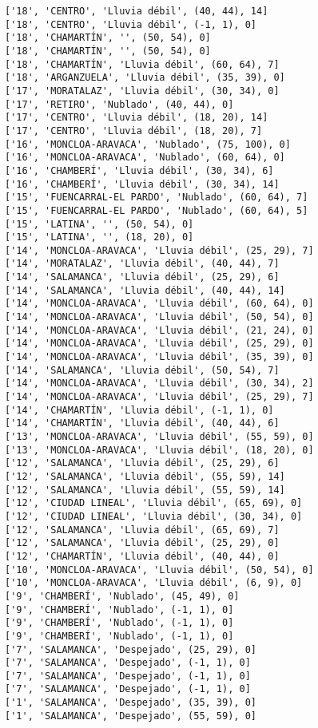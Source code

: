 \documentclass[11pt]{article}
\begin{document}
\begin{Verbatim}[commandchars=\\\{\}]
['18', 'CENTRO', 'Lluvia débil', (40, 44), 14]
['18', 'CENTRO', 'Lluvia débil', (-1, 1), 0]
['18', 'CHAMARTÍN', '', (50, 54), 0]
['18', 'CHAMARTÍN', '', (50, 54), 0]
['18', 'CHAMARTÍN', 'Lluvia débil', (60, 64), 7]
['18', 'ARGANZUELA', 'Lluvia débil', (35, 39), 0]
['17', 'MORATALAZ', 'Lluvia débil', (30, 34), 0]
['17', 'RETIRO', 'Nublado', (40, 44), 0]
['17', 'CENTRO', 'Lluvia débil', (18, 20), 14]
['17', 'CENTRO', 'Lluvia débil', (18, 20), 7]
['16', 'MONCLOA-ARAVACA', 'Nublado', (75, 100), 0]
['16', 'MONCLOA-ARAVACA', 'Nublado', (60, 64), 0]
['16', 'CHAMBERÍ', 'Lluvia débil', (30, 34), 6]
['16', 'CHAMBERÍ', 'Lluvia débil', (30, 34), 14]
['15', 'FUENCARRAL-EL PARDO', 'Nublado', (60, 64), 7]
['15', 'FUENCARRAL-EL PARDO', 'Nublado', (60, 64), 5]
['15', 'LATINA', '', (50, 54), 0]
['15', 'LATINA', '', (18, 20), 0]
['14', 'MONCLOA-ARAVACA', 'Lluvia débil', (25, 29), 7]
['14', 'MORATALAZ', 'Lluvia débil', (40, 44), 7]
['14', 'SALAMANCA', 'Lluvia débil', (25, 29), 6]
['14', 'SALAMANCA', 'Lluvia débil', (40, 44), 14]
['14', 'MONCLOA-ARAVACA', 'Lluvia débil', (60, 64), 0]
['14', 'MONCLOA-ARAVACA', 'Lluvia débil', (50, 54), 0]
['14', 'MONCLOA-ARAVACA', 'Lluvia débil', (21, 24), 0]
['14', 'MONCLOA-ARAVACA', 'Lluvia débil', (25, 29), 0]
['14', 'MONCLOA-ARAVACA', 'Lluvia débil', (35, 39), 0]
['14', 'SALAMANCA', 'Lluvia débil', (50, 54), 7]
['14', 'MONCLOA-ARAVACA', 'Lluvia débil', (30, 34), 2]
['14', 'MONCLOA-ARAVACA', 'Lluvia débil', (25, 29), 7]
['14', 'CHAMARTÍN', 'Lluvia débil', (-1, 1), 0]
['14', 'CHAMARTÍN', 'Lluvia débil', (40, 44), 6]
['13', 'MONCLOA-ARAVACA', 'Lluvia débil', (55, 59), 0]
['13', 'MONCLOA-ARAVACA', 'Lluvia débil', (18, 20), 0]
['12', 'SALAMANCA', 'Lluvia débil', (25, 29), 6]
['12', 'SALAMANCA', 'Lluvia débil', (55, 59), 14]
['12', 'SALAMANCA', 'Lluvia débil', (55, 59), 14]
['12', 'CIUDAD LINEAL', 'Lluvia débil', (65, 69), 0]
['12', 'CIUDAD LINEAL', 'Lluvia débil', (30, 34), 0]
['12', 'SALAMANCA', 'Lluvia débil', (65, 69), 7]
['12', 'SALAMANCA', 'Lluvia débil', (25, 29), 0]
['12', 'CHAMARTÍN', 'Lluvia débil', (40, 44), 0]
['10', 'MONCLOA-ARAVACA', 'Lluvia débil', (50, 54), 0]
['10', 'MONCLOA-ARAVACA', 'Lluvia débil', (6, 9), 0]
['9', 'CHAMBERÍ', 'Nublado', (45, 49), 0]
['9', 'CHAMBERÍ', 'Nublado', (-1, 1), 0]
['9', 'CHAMBERÍ', 'Nublado', (-1, 1), 0]
['9', 'CHAMBERÍ', 'Nublado', (-1, 1), 0]
['7', 'SALAMANCA', 'Despejado', (25, 29), 0]
['7', 'SALAMANCA', 'Despejado', (-1, 1), 0]
['7', 'SALAMANCA', 'Despejado', (-1, 1), 0]
['7', 'SALAMANCA', 'Despejado', (-1, 1), 0]
['1', 'SALAMANCA', 'Despejado', (35, 39), 0]
['1', 'SALAMANCA', 'Despejado', (55, 59), 0]

\end{Verbatim}
\end{document}
